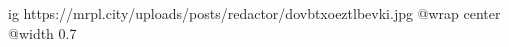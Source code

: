  
 
 
 
 

\ifcmt
  ig https://mrpl.city/uploads/posts/redactor/dovbtxoeztlbevki.jpg
  @wrap center
  @width 0.7
\fi
